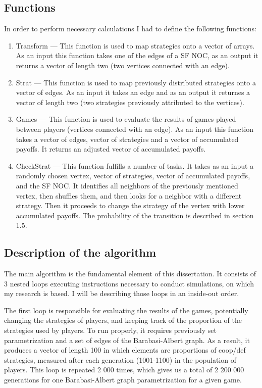 \documentclass[english, twoside, 12pt, a4paper]{article}
\theoremstyle{definition}
\theoremstyle{plain}
\theoremstyle{remark}
\begin{document}
\subsection{Functions}
In order to perform necessary calculations I had to define the following functions:

\begin{enumerate}
  \item Transform --- This function is used to map strategies onto a vector of arrays. As an input this function takes one of the edges of a SF NOC,
   as an output it returns a vector of length two (two vertices connected with an edge).
  \item Strat --- This function is used to map previously distributed strategies onto a vector of edges. As an input it takes an edge and as an output
   it returnes a vector of length two (two strategies previously attributed to the vertices).
  \item Games --- This function is used to evaluate the results of games played between players (vertices connected with an edge). As an input this function
   takes a vector of edges, vector of strategies and a vector of accumulated payoffs. It returns an adjusted vector of accumulated payoffs.
  \item CheckStrat --- This function fulfills a number of tasks. It takes as an input a randomly chosen vertex, vector of strategies, vector of accumulated
  payoffs, and the SF NOC. It identifies all neighbors of the previously mentioned vertex, then shuffles them, and then looks for a neighbor
  with a different strategy. Then it proceeds to change the strategy of the vertex with lower accumulated payoffs. The probability of the transition 
  is described in section 1.5. 
\end{enumerate}

\subsection{Description of the algorithm}

The main algorithm is the fundamental element of this dissertation. It consists of 3 nested loops executing instructions necessary to conduct simulations, on which
my research is based. I will be describing those loops in an inside-out order. 

The first loop is responsible for evaluating the results of the games, potentially changing the strategies of players, and keeping track of the proportion of the strategies
used by players. To run properly, it requires previously set parametrization and a set of edges of the Barabasi-Albert graph. As a result, it produces a vector of length 
100 in which elements are proportions of coop/def strategies, measured after each generation (1001-1100) in the population of players. This loop is repeated 2 000 times, which gives
us a total of 2 200 000 generations for one Barabasi-Albert graph parametrization for a given game.
\end{document}
